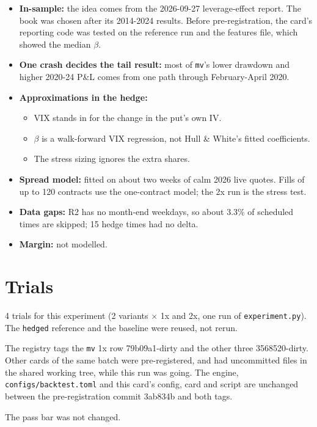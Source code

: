 \documentclass{article}
\begin{document}
\begin{itemize}

\item \textbf{In-sample:} the idea comes from the 2026-09-27 leverage-effect report. The book was chosen after its 2014-2024 results. Before pre-registration, the card's reporting code was tested on the reference run and the features file, which showed the median \ensuremath{\beta}.

\item \textbf{One crash decides the tail result:} most of \texttt{mv}'s lower drawdown and higher 2020-24 P\&L comes from one path through February-April 2020.

\item \textbf{Approximations in the hedge:}

\begin{itemize}

\item VIX stands in for the change in the put's own IV.

\item \ensuremath{\beta} is a walk-forward VIX regression, not Hull \& White's fitted coefficients.

\item The stress sizing ignores the extra shares.

\end{itemize}

\item \textbf{Spread model:} fitted on about two weeks of calm 2026 live quotes. Fills of up to 120 contracts use the one-contract model; the 2x run is the stress test.

\item \textbf{Data gaps:} R2 has no month-end weekdays, so about 3.3\% of scheduled times are skipped; 15 hedge times had no delta.

\item \textbf{Margin:} not modelled.

\end{itemize}

\section{Trials}

4 trials for this experiment (2 variants \ensuremath{\times} 1x and 2x, one run of \texttt{experiment.\allowbreak{}py}). The \texttt{hedged} reference and the baseline were reused, not rerun.

The registry tags the \texttt{mv} 1x row 79b09a1-dirty and the other three 3568520-dirty. Other cards of the same batch were pre-registered, and had uncommitted files in the shared working tree, while this run was going. The engine, \texttt{configs/\allowbreak{}backtest.\allowbreak{}toml} and this card's config, card and script are unchanged between the pre-registration commit 3ab834b and both tags.

The pass bar was not changed.
\end{document}

